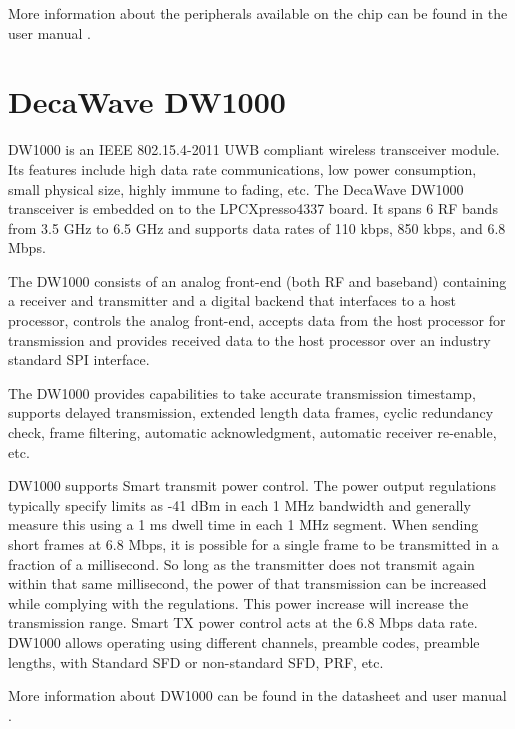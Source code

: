 More information about the peripherals available on the chip can be found in the user manual \cite{LPCUserManual}.

\section{DecaWave DW1000}
DW1000 \cite{DW1000UserManual} is an IEEE 802.15.4-2011 UWB compliant wireless transceiver module. Its features include high data rate communications, low power consumption, small physical size, highly immune to fading, etc. The DecaWave DW1000 transceiver is embedded on to the LPCXpresso4337 board. It spans 6 RF bands from 3.5 GHz to 6.5 GHz and supports data rates of 110 kbps, 850 kbps, and 6.8 Mbps.

The DW1000 consists of an analog front-end (both RF and baseband) containing a receiver and transmitter and a digital backend that interfaces to a host processor, controls the analog front-end, accepts data from the host processor for transmission and provides received data to the host processor over an industry standard SPI interface. 

The DW1000 provides capabilities to take accurate transmission timestamp, supports delayed transmission, extended length data frames, cyclic redundancy check, frame filtering, automatic acknowledgment, automatic receiver re-enable, etc.

DW1000 supports Smart transmit power control. The power output regulations typically specify limits as -41 dBm in each 1 MHz bandwidth and generally measure this using a 1 ms dwell time in each 1 MHz segment.  When sending short frames at 6.8 Mbps, it is possible for a single frame to be transmitted in a fraction of a millisecond. So long as the transmitter does not transmit again within that same millisecond, the power of that transmission can be increased while complying with the regulations.  This power increase will increase the transmission range. Smart TX power control acts at the 6.8 Mbps data rate. DW1000 allows operating using different channels, preamble codes, preamble lengths, with Standard SFD or non-standard SFD, PRF, etc.

More information about DW1000 can be found in the datasheet \cite{DW1000DataSheet} and user manual \cite{DW1000UserManual}.